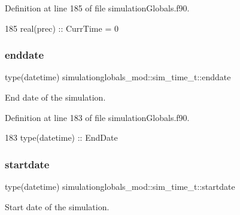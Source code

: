 Definition at line 185 of file simulation\+Globals.\+f90.


\begin{DoxyCode}
185         \textcolor{keywordtype}{real(prec)}      :: CurrTime = 0
\end{DoxyCode}
\mbox{\label{structsimulationglobals__mod_1_1sim__time__t_aaaf97413c1d145b1eb979ad2abbdd90e}} 
\subsubsection{\texorpdfstring{enddate}{enddate}}
{\footnotesize\ttfamily type(datetime) simulationglobals\+\_\+mod\+::sim\+\_\+time\+\_\+t\+::enddate\hspace{0.3cm}{\ttfamily [private]}}



End date of the simulation. 



Definition at line 183 of file simulation\+Globals.\+f90.


\begin{DoxyCode}
183         \textcolor{keywordtype}{type}(datetime)  :: EndDate
\end{DoxyCode}
\mbox{\label{structsimulationglobals__mod_1_1sim__time__t_a4d412156c617a836839456e857e249de}} 
\subsubsection{\texorpdfstring{startdate}{startdate}}
{\footnotesize\ttfamily type(datetime) simulationglobals\+\_\+mod\+::sim\+\_\+time\+\_\+t\+::startdate\hspace{0.3cm}{\ttfamily [private]}}



Start date of the simulation. 




